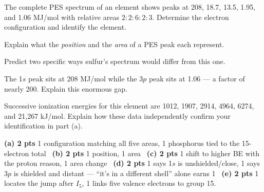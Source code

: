 \documentclass{apchem-worksheet}
\begin{document}
\begin{parts}
  \item The complete PES spectrum of an element shows peaks at 208, 18.7,
        13.5, 1.95, and 1.06 MJ/mol with relative areas $2:2:6:2:3$.
        Determine the electron configuration and identify the element.
  \item Explain what the \emph{position} and the \emph{area} of a PES peak
        each represent. 
  \item Predict two specific ways sulfur's spectrum would differ from this
        one. 
  \item The 1$s$ peak sits at 208 MJ/mol while the 3$p$ peak sits at 1.06
        --- a factor of nearly 200. Explain this enormous gap.
  \item Successive ionization energies for this element are 1012, 1907,
        2914, 4964, 6274, and 21{,}267 kJ/mol. Explain how these data
        independently confirm your identification in part (a).
\end{parts}

\begin{apcnote}
\textbf{(a) 2 pts} 1 configuration matching all five areas, 1 phosphorus
tied to the 15-electron total \textbullet\ \textbf{(b) 2 pts} 1 position,
1 area \textbullet\ \textbf{(c) 2 pts} 1 shift to higher BE with the proton
reason, 1 area change \textbullet\ \textbf{(d) 2 pts} 1 says 1$s$ is
unshielded/close, 1 says 3$p$ is shielded and distant --- ``it's in a
different shell'' alone earns 1 \textbullet\ \textbf{(e) 2 pts} 1 locates
the jump after $I_5$, 1 links five valence electrons to group 15.
\end{apcnote}
\end{document}
